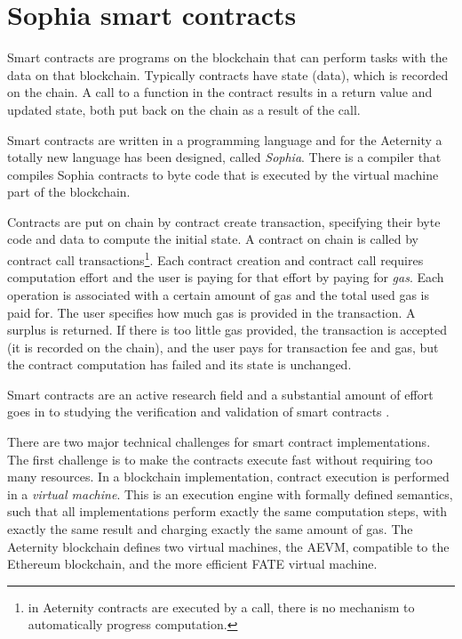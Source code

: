 \section{Sophia smart contracts}
\label{sect:sophia}

Smart contracts \cite{szabo1996smart,hhz007} are
programs on the blockchain that can perform tasks with the data on that
blockchain. Typically contracts have state (data), which is recorded on the
chain. A call to a function in the contract results in a return value
and updated state, both put back on the chain as a result of the
call.

Smart contracts are written in a programming language and for the
Aeternity a totally new language has been designed, called
\textit{Sophia}. There is a compiler that compiles Sophia contracts to
byte code that is executed by the virtual machine part of the
blockchain.

Contracts are put on chain by contract create
transaction, specifying their byte code and data to compute the
initial state. A contract on chain is called by contract call transactions\footnote{in
  Aeternity contracts are executed by a call, there is no
  mechanism to automatically progress computation.}. Each contract
creation and contract call requires computation effort and the user is paying
for that effort by paying for \textit{gas}. Each operation is
associated with a certain amount of gas and the total used gas is paid
for. The user specifies how much gas is provided in the transaction. A
surplus is returned. If there is too little gas provided, the
transaction is accepted (it is recorded
on the chain), and the user pays for transaction fee and gas,
but the contract computation has failed and its state is unchanged.

Smart contracts are an active research field
\cite{DBLP:journals/corr/abs-1710-06372} and a substantial amount of
  effort goes in to studying the verification and validation of smart contracts
  \cite{magazzeni2017validation,bhargavan2016formal}.

There are two major technical challenges for smart contract
implementations. The first challenge is to make the contracts
execute fast without requiring too many resources. In a blockchain
implementation, contract execution is performed in a
\textit{virtual machine}. This is an execution engine with formally
defined semantics, such that all implementations perform exactly the
same computation steps, with exactly the same result and charging
exactly the same amount of gas. The Aeternity blockchain defines two virtual
machines, the AEVM, compatible to the Ethereum blockchain, and the more
efficient FATE virtual machine.

